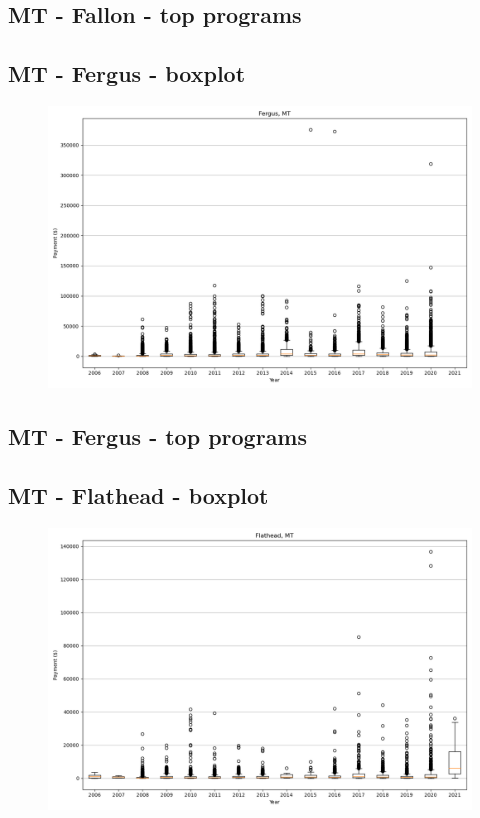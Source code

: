 \subsection*{MT - Fallon - top programs}

\newpage
\subsection*{MT - Fergus - boxplot}
\begin{figure}[h]
\centering
\includegraphics[width=7in]{../output/boxplots/counties/Fergus-MT_boxplot.png}
\end{figure}


\subsection*{MT - Fergus - top programs}

\newpage
\subsection*{MT - Flathead - boxplot}
\begin{figure}[h]
\centering
\includegraphics[width=7in]{../output/boxplots/counties/Flathead-MT_boxplot.png}
\end{figure}


